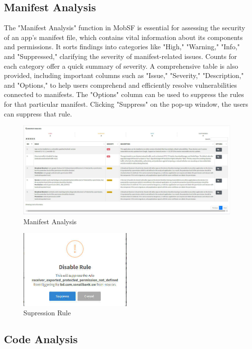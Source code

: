 \documentclass{report}
\begin{document}
\subsection{Manifest Analysis}
The "Manifest Analysis" function in MobSF is essential for assessing the security of an app's manifest file, which contains vital information about its components and permissions. It sorts findings into categories like "High," "Warning," "Info," and "Suppressed," clarifying the severity of manifest-related issues. Counts for each category offer a quick summary of severity. A comprehensive table is also provided, including important columns such as "Issue," "Severity," "Description," and "Options," to help users comprehend and efficiently resolve vulnerabilities connected to manifests. The "Options" column can be used to suppress the rules for that particular manifest. Clicking "Suppress" on the pop-up window, the users can suppress that rule.
\begin{figure}[hbt!]
        \centering
        \includegraphics[width=1\textwidth]{images/manifest.jpg}
        \caption{Manifest Analysis}
        \label{fig:example}
\end{figure}
\FloatBarrier
\begin{figure}[hbt!]
    \centering
    \includegraphics[width=0.5\textwidth]{images/supressrule.jpg}
    \caption{Supression Rule}
    \label{fig:example}
\end{figure}
\FloatBarrier

\subsection{Code Analysis}
\end{document}
